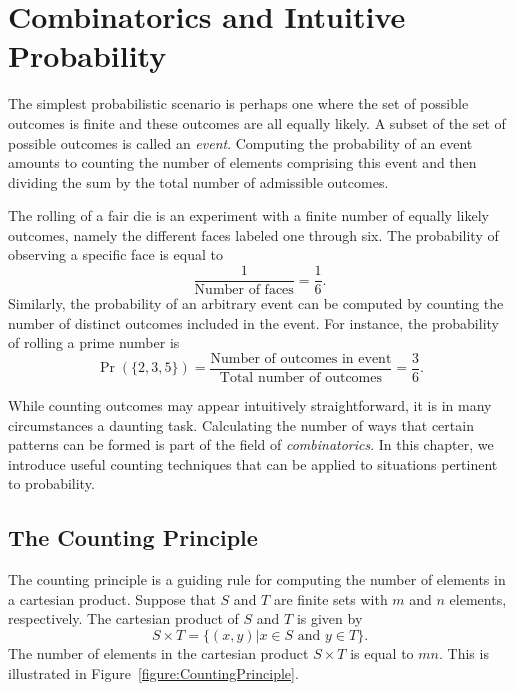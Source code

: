 \chapter[Combinatorics]{Combinatorics and Intuitive Probability}

The simplest probabilistic scenario is perhaps one where the set of possible outcomes is finite and these outcomes are all equally likely.
A subset of the set of possible outcomes is called an \emph{event}.
Computing the probability of an event amounts to counting the number of elements comprising this event and then dividing the sum by the total number of admissible outcomes.

\begin{example}
The rolling of a fair die is an experiment with a finite number of equally likely outcomes, namely the different faces labeled one through six.
The probability of observing a specific face is equal to
\begin{equation*}
\frac{1}{\text{Number of faces}} = \frac{1}{6} .
\end{equation*}
Similarly, the probability of an arbitrary event can be computed by counting the number of distinct outcomes included in the event.
For instance, the probability of rolling a prime number is
\begin{equation*}
\Pr ( \{ 2, 3, 5 \} )
= \frac{\text{Number of outcomes in event}}{\text{Total number of outcomes}}
= \frac{3}{6} .
\end{equation*}
\end{example}

While counting outcomes may appear intuitively straightforward, it is in many circumstances a daunting task.
Calculating the number of ways that certain patterns can be formed is part of the field of \emph{combinatorics}. 
In this chapter, we introduce useful counting techniques that can be applied to situations pertinent to probability.


\section{The Counting Principle}

The counting principle is a guiding rule for computing the number of elements in a cartesian product.
Suppose that $S$ and $T$ are finite sets with $m$ and $n$ elements, respectively.
The cartesian product of $S$ and $T$ is given by
\begin{equation*}
S \times T = \{ (x, y) | x \in S \text{ and } y \in T \} .
\end{equation*}
The number of elements in the cartesian product $S \times T$ is equal to $m n$.
This is illustrated in Figure~\ref{figure:CountingPrinciple}.

